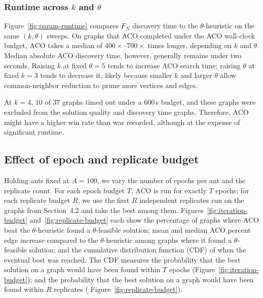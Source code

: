 \documentclass[conference]{IEEEtran}
\begin{document}




\FloatBarrier
\subsubsection{Runtime across $k$ and $\theta$}


Figure~\ref{fig:param-runtime} compares $F_N$ discovery time to the $\theta$-heuristic on the same $(k, \theta)$ sweeps. On graphs that ACO completed under the ACO wall-clock budget, ACO takes a median of $400\times$--$700\times$ times longer, depending on $k$ and $\theta$. Median absolute ACO discovery time, however, generally remains under two seconds. Raising $k$ at fixed $\theta = 5$ tends to increase ACO search time; raising $\theta$ at fixed $k = 3$ tends to decrease it, likely because smaller $k$ and larger $\theta$ allow common-neighbor reduction to prune more vertices and edges.


At $k = 4$, $10$ of $37$ graphs timed out under a $600$\,s budget, and these graphs were excluded from the solution quality and discovery time graphs. Therefore, ACO might have a higher win rate than was recorded, although at the expense of significant runtime.




\FloatBarrier
\subsection{Effect of epoch and replicate budget}


Holding ants fixed at $A=100$, we vary the number of epochs per ant and the replicate count. For each epoch budget $T$, ACO is run for exactly $T$ epochs; for each replicate budget $R$, we use the first $R$ independent replicates run on the graphs from Section~4.2 and take the best among them. Figures~\ref{fig:iteration-budget} and~\ref{fig:replicate-budget} each show the percentage of graphs where ACO beat the $\theta$-heuristic found a $\theta$-feasible solution; mean and median ACO percent edge increase compared to the $\theta$-heuristic among graphs where it found a $\theta$-feasible solution; and the cumulative distribution function (CDF) of when the eventual best was reached. The CDF measures the probability that the best solution on a graph would have been found within $T$ epochs (Figure~\ref{fig:iteration-budget}); and the probability that the best solution on a graph would have been found within $R$ replicates ( Figure~\ref{fig:replicate-budget}).
\end{document}
